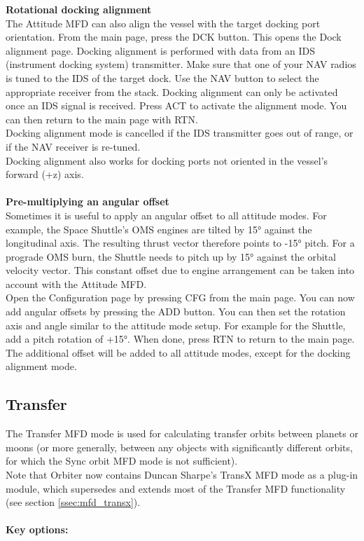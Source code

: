 \documentclass[Orbiter User Manual.tex]{subfiles}
\begin{document}
\noindent
\textbf{Rotational docking alignment}\\
The Attitude MFD can also align the vessel with the target docking port orientation. From the main page, press the DCK button. This opens the Dock alignment page. Docking alignment is performed with data from an IDS (instrument docking system) transmitter. Make sure that one of your NAV radios is tuned to the IDS of the target dock. Use the NAV button to select the appropriate receiver from the stack. Docking alignment can only be activated once an IDS signal is received. Press ACT to activate the alignment mode. You can then return to the main page with RTN.\\
Docking alignment mode is cancelled if the IDS transmitter goes out of range, or if the NAV receiver is re-tuned.\\
Docking alignment also works for docking ports not oriented in the vessel's forward (+z) axis.\\
\\
\textbf{Pre-multiplying an angular offset}\\
Sometimes it is useful to apply an angular offset to all attitude modes. For example, the Space Shuttle's OMS engines are tilted by 15° against the longitudinal axis. The resulting thrust vector therefore points to -15° pitch. For a prograde OMS burn, the Shuttle needs to pitch up by 15° against the orbital velocity vector. This constant offset due to engine arrangement can be taken into account with the Attitude MFD.\\
Open the Configuration page by pressing CFG from the main page. You can now add angular offsets by pressing the ADD button. You can then set the rotation axis and angle similar to the attitude mode setup. For example for the Shuttle, add a pitch rotation of +15°. When done, press RTN to return to the main page. The additional offset will be added to all attitude modes, except for the docking alignment mode.


\subsection{Transfer}
\label{ssec:mfd_transfer}
The Transfer MFD mode is used for calculating transfer orbits between planets or moons (or more generally, between any objects with significantly different orbits, for which the Sync orbit MFD mode is not sufficient).\\
Note that Orbiter now contains Duncan Sharpe's TransX MFD mode as a plug-in module, which supersedes and extends most of the Transfer MFD functionality (see section \ref{ssec:mfd_transx}).\\
\\
\textbf{Key options:}
\end{document}
